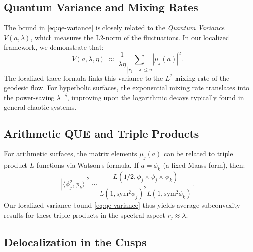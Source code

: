
\subsection{Quantum Variance and Mixing Rates}

The bound in \eqref{eq:qe-variance} is closely related to the \emph{Quantum Variance} $V(a, \lambda)$, which measures the L2-norm of the fluctuations. In our localized framework, we demonstrate that:
\begin{equation}
V(a, \lambda, \eta) \; \approx \; \frac{1}{\lambda \eta} \sum_{|r_j - \lambda| \le \eta} |\mu_j(a)|^2.
\end{equation}
The localized trace formula links this variance to the $L^2$-mixing rate of the geodesic flow. For hyperbolic surfaces, the exponential mixing rate translates into the power-saving $\lambda^{-\delta}$, improving upon the logarithmic decays typically found in general chaotic systems.

\subsection{Arithmetic QUE and Triple Products}

For arithmetic surfaces, the matrix elements $\mu_j(a)$ can be related to triple product $L$-functions via Watson's formula. If $a = \phi_k$ (a fixed Maass form), then:
\begin{equation}
|\langle \phi_j^2, \phi_k \rangle|^2 \sim \frac{L(1/2, \phi_j \times \phi_j \times \phi_k)}{L(1, \text{sym}^2 \phi_j)^2 L(1, \text{sym}^2 \phi_k)}.
\end{equation}
Our localized variance bound \eqref{eq:qe-variance} thus yields average subconvexity results for these triple products in the spectral aspect $r_j \approx \lambda$.


\subsection{Delocalization in the Cusps}

